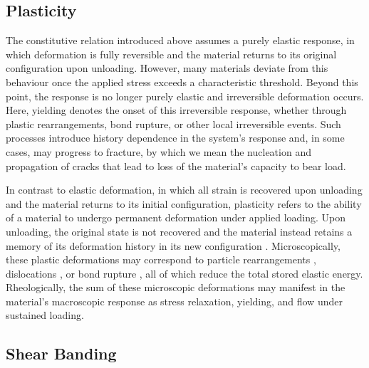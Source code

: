 \documentclass[asymmetricmargins]{library/duthesis}%
\begin{document}
\subsection{Plasticity} \label{sec:Plasticity}
The constitutive relation introduced above assumes a purely elastic response, in which deformation is fully reversible and the material returns to its original configuration upon unloading. However, many materials deviate from this behaviour once the applied stress exceeds a characteristic threshold. Beyond this point, the response is no longer purely elastic and irreversible deformation occurs. Here, yielding denotes the onset of this irreversible response, whether through plastic rearrangements, bond rupture, or other local irreversible events. Such processes introduce history dependence in the system's response and, in some cases, may progress to fracture, by which we mean the nucleation and propagation of cracks that lead to loss of the material's capacity to bear load.

In contrast to elastic deformation, in which all strain is recovered upon unloading and the material returns to its initial configuration, plasticity refers to the ability of a material to undergo permanent deformation under applied loading. Upon unloading, the original state is not recovered and the material instead retains a memory of its deformation history in its new configuration \cite{lubliner2008plasticity,Simo2000-ComputationalInelasticity,Wu2004}. Microscopically, these plastic deformations may correspond to particle rearrangements \cite{falk_dynamics_1998,maloney_amorphous_2006,tanguy_plastic_2006,gartner_nonlinear_2016}, dislocations \cite{shiba_plastic_2010, ispanovity_avalanches_2014,ben-zion_earthquake_1993}, or bond rupture \cite{tauber_stretchy_2022,ducrot_toughening_2014,Creton50th2017,vernereyStatisticalDamageMechanics2018,gong_why_2010}, all of which reduce the total stored elastic energy. Rheologically, the sum of these microscopic deformations may manifest in the material's macroscopic response as stress relaxation, yielding, and flow under sustained loading.

\subsection{Shear Banding} \label{sec:ShearBanding}
\end{document}
